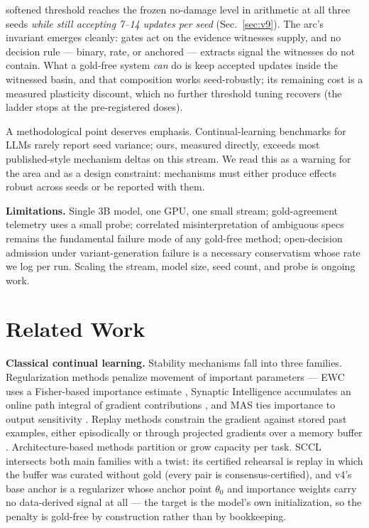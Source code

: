 \documentclass[10pt,conference]{IEEEtran}
\begin{document}
softened threshold reaches the frozen no-damage level in arithmetic at all three seeds \emph{while still accepting 7--14 updates per seed} (Sec.~\ref{sec:v9}). The arc's invariant emerges cleanly: gates act on the evidence witnesses supply, and no decision rule --- binary, rate, or anchored --- extracts signal the witnesses do not contain. What a gold-free system \emph{can} do is keep accepted updates inside the witnessed basin, and that composition works seed-robustly; its remaining cost is a measured plasticity discount, which no further threshold tuning recovers (the ladder stops at the pre-registered doses).

A methodological point deserves emphasis. Continual-learning benchmarks for LLMs rarely report seed variance; ours, measured directly, exceeds most published-style mechanism deltas on this stream. We read this as a warning for the area and as a design constraint: mechanisms must either produce effects robust across seeds or be reported with them.

\textbf{Limitations.} Single 3B model, one GPU, one small stream; gold-agreement telemetry uses a small probe; correlated misinterpretation of ambiguous specs remains the fundamental failure mode of any gold-free method; open-decision admission under variant-generation failure is a necessary conservatism whose rate we log per run. Scaling the stream, model size, seed count, and probe is ongoing work.

\section{Related Work}
\textbf{Classical continual learning.} Stability mechanisms fall into three families. Regularization methods penalize movement of important parameters --- EWC uses a Fisher-based importance estimate \cite{kirkpatrick2017ewc}, Synaptic Intelligence accumulates an online path integral of gradient contributions \cite{si}, and MAS ties importance to output sensitivity \cite{mas}. Replay methods constrain the gradient against stored past examples, either episodically \cite{er} or through projected gradients over a memory buffer \cite{gem,agem}. Architecture-based methods partition or grow capacity per task. SCCL intersects both main families with a twist: its certified rehearsal is replay in which the buffer was curated without gold (every pair is consensus-certified), and v4's base anchor is a regularizer whose anchor point $\theta_0$ and importance weights carry no data-derived signal at all --- the target is the model's own initialization, so the penalty is gold-free by construction rather than by bookkeeping.
\end{document}
